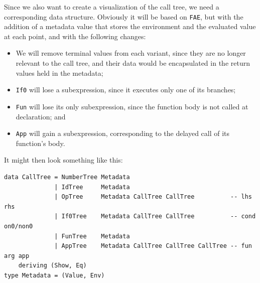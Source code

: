 \documentclass[format=acmlarge, review=false, nonacm=false, screen=true]{acmart}
\begin{document}
Since we also want to create a visualization of the call tree, we need a corresponding data structure. Obviously it will be based on \texttt{FAE}, but with the addition of a metadata value that stores the environment and the evaluated value at each point, and with the following changes:
    \begin{itemize}
        \item We will remove terminal values from each variant, since they are no longer relevant to the call tree, and their data would be encapsulated in the return values held in the metadata;
        \item \texttt{If0} will lose a subexpression, since it executes only one of its branches; 
        \item \texttt{Fun} will lose its only subexpression, since the function body is not called at declaration; and
        \item \texttt{App} will gain a subexpression, corresponding to the delayed call of its function's body.
    \end{itemize}
It might then look something like this:
\begin{verbatim}
data CallTree = NumberTree Metadata
              | IdTree     Metadata
              | OpTree     Metadata CallTree CallTree          -- lhs rhs
              | If0Tree    Metadata CallTree CallTree          -- cond on0/non0
              | FunTree    Metadata
              | AppTree    Metadata CallTree CallTree CallTree -- fun arg app
    deriving (Show, Eq)
type Metadata = (Value, Env)
\end{verbatim}
\end{document}

